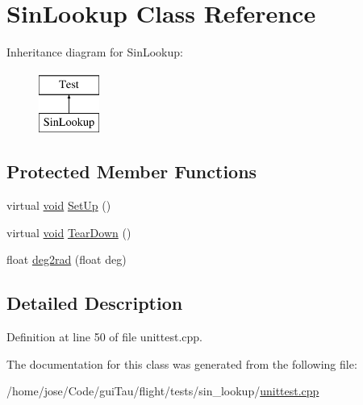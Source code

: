 \hypertarget{class_sin_lookup}{\section{Sin\-Lookup Class Reference}
\label{class_sin_lookup}
}
Inheritance diagram for Sin\-Lookup\-:\begin{figure}[H]
\begin{center}
\leavevmode
\includegraphics[height=2.000000cm]{class_sin_lookup}
\end{center}
\end{figure}
\subsection*{Protected Member Functions}
\begin{DoxyCompactItemize}
\item 
virtual \hyperlink{group___n_a_m_e_ga18028b8badbf1ea7e704ccac3c488e82}{void} \hyperlink{group___unit_tests_gaf5c7e4b5a50e259ba0c95e5134d66b9b}{Set\-Up} ()
\item 
virtual \hyperlink{group___n_a_m_e_ga18028b8badbf1ea7e704ccac3c488e82}{void} \hyperlink{group___unit_tests_ga93c08f4058ee3f8c7de2ac69b799b386}{Tear\-Down} ()
\item 
float \hyperlink{group___unit_tests_gab9e378171158291991120fdea72f48f0}{deg2rad} (float deg)
\end{DoxyCompactItemize}


\subsection{Detailed Description}


Definition at line 50 of file unittest.\-cpp.



The documentation for this class was generated from the following file\-:\begin{DoxyCompactItemize}
\item 
/home/jose/\-Code/gui\-Tau/flight/tests/sin\-\_\-lookup/\hyperlink{sin__lookup_2unittest_8cpp}{unittest.\-cpp}\end{DoxyCompactItemize}
